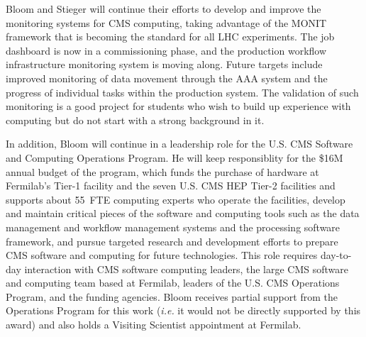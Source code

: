 Bloom and Stieger will continue their efforts to develop and improve the monitoring systems for CMS computing, taking advantage of the MONIT framework that is becoming the standard for all LHC experiments.  The job dashboard is now in a commissioning phase, and the production workflow infrastructure monitoring system is moving along.  Future targets include improved monitoring of data movement through the AAA system and the progress of individual tasks within the production system.  The validation of such monitoring is a good project for students who wish to build up experience with computing but do not start with a strong background in it.

In addition, Bloom will continue in a leadership role for the U.S. CMS Software and Computing Operations Program.  He will keep responsiblity for the \$16M annual budget of the program, which funds the purchase of hardware at Fermilab's Tier-1 facility and the seven U.S. CMS HEP Tier-2 facilities and supports about 55~FTE computing experts who operate the facilities, develop and maintain critical pieces of the software and computing tools such as the data management and workflow management systems and the processing software framework, and pursue targeted research and development efforts to prepare CMS software and computing for future technologies.  This role requires day-to-day interaction with CMS software computing leaders, the large CMS software and computing team based at Fermilab, leaders of the U.S. CMS Operations Program, and the funding agencies.  Bloom receives partial support from the Operations Program for this work ({\it i.e.} it would not be directly supported by this award) and also holds a Visiting Scientist appointment at Fermilab.

